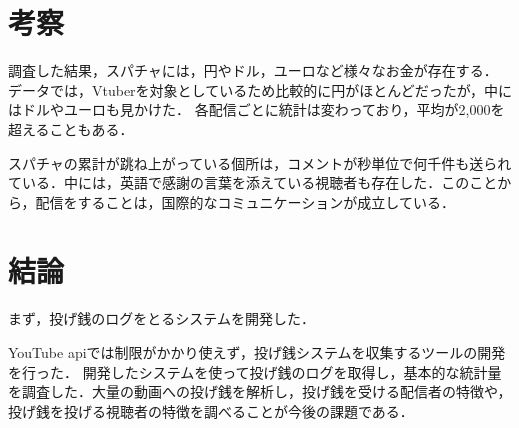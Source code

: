 \documentclass[uplatex,twocolumn]{jsarticle}
\begin{document}
\section{考察}
調査した結果，スパチャには，円やドル，ユーロなど様々なお金が存在する．
データでは，Vtuberを対象としているため比較的に円がほとんどだったが，中にはドルやユーロも見かけた．
各配信ごとに統計は変わっており，平均が2,000を超えることもある．

スパチャの累計が跳ね上がっている個所は，コメントが秒単位で何千件も送られている．中には，英語で感謝の言葉を添えている視聴者も存在した．このことから，配信をすることは，国際的なコミュニケーションが成立している．

\section{結論}
まず，投げ銭のログをとるシステムを開発した．

YouTube apiでは制限がかかり使えず，投げ銭システムを収集するツールの開発を行った．
開発したシステムを使って投げ銭のログを取得し，基本的な統計量を調査した．大量の動画への投げ銭を解析し，投げ銭を受ける配信者の特徴や，投げ銭を投げる視聴者の特徴を調べることが今後の課題である．



\end{document}
